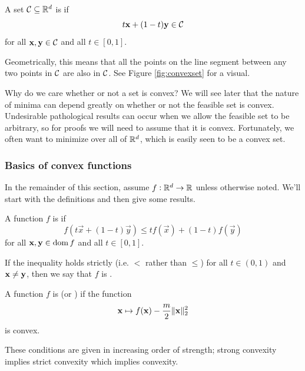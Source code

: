 A set $\mathcal{C} \subseteq \mathbb{R}^d$ is  if
\[t\mathbf{x} + (1-t)\mathbf{y} \in \mathcal{C}\]
for all $\mathbf{x}, \mathbf{y} \in \mathcal{C}$ and all $t \in [0,1]$.

Geometrically, this means that all the points on the line segment between any two points in $\mathcal{C}$ are also in $\mathcal{C}$.
See Figure \ref{fig:convexset} for a visual.

Why do we care whether or not a set is convex?
We will see later that the nature of minima can depend greatly on whether or not the feasible set is convex.
Undesirable pathological results can occur when we allow the feasible set to be arbitrary, so for proofs we will need to assume that it is convex.
Fortunately, we often want to minimize over all of $\mathbb{R}^d$, which is easily seen to be a convex set.

\subsubsection{Basics of convex functions}
In the remainder of this section, assume $f : \mathbb{R}^d \to \mathbb{R}$ unless otherwise noted. We'll start with the definitions and then give some results.

A function $f$ is  if
\[f(t\vec{x} + (1-t)\vec{y}) \leq t f(\vec{x}) + (1-t)f(\vec{y})\]
for all $\mathbf{x}, \mathbf{y} \in \operatorname*{dom} f$ and all $t \in [0,1]$.

If the inequality holds strictly (i.e. $<$ rather than $\leq$) for all $t \in (0,1)$ and $\mathbf{x} \neq \mathbf{y}$, then we say that $f$ is .

A function $f$ is  (or ) if the function
\[\mathbf{x} \mapsto f(\mathbf{x}) - \frac{m}{2}\|\mathbf{x}\|_2^2\]
is convex.

These conditions are given in increasing order of strength; strong convexity implies strict convexity which implies convexity.

%

